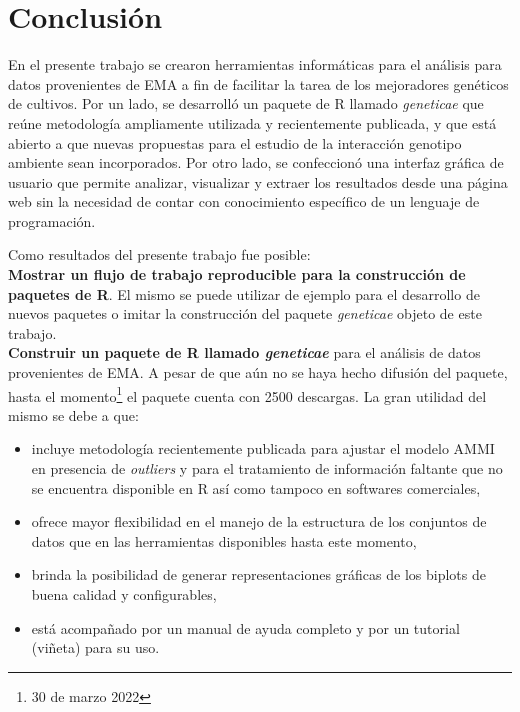 \chapter{Conclusión}

En el presente trabajo se crearon herramientas informáticas para el análisis para datos provenientes de EMA a fin de facilitar la tarea de los mejoradores genéticos de cultivos. Por un lado, se desarrolló un paquete de R llamado \emph{geneticae} que reúne metodología ampliamente utilizada y recientemente publicada, y que está abierto a que nuevas propuestas para el estudio de la interacción genotipo ambiente sean incorporados. Por otro lado, se confeccionó una interfaz gráfica de usuario que permite analizar, visualizar y extraer los resultados desde una página web sin la necesidad de contar con conocimiento específico de un lenguaje de programación.

Como resultados del presente trabajo fue posible:\\

\textbf{Mostrar un flujo de trabajo reproducible para la construcción de paquetes de R}. El mismo se puede utilizar de ejemplo para el desarrollo de nuevos paquetes o imitar la construcción del paquete \emph{geneticae} objeto de este trabajo. \\

\textbf{Construir un paquete de R llamado \emph{geneticae}} para el análisis de datos provenientes de EMA. A pesar de que aún no se haya hecho difusión del paquete, hasta el momento\footnote{30 de marzo 2022} el paquete cuenta con 2500 descargas. La gran utilidad del mismo se debe a que:

\begin{itemize}
\item incluye metodología recientemente publicada para ajustar el modelo AMMI en presencia de \emph{outliers} y para el tratamiento de información faltante que no se encuentra disponible en R así como tampoco en softwares comerciales,

\item ofrece mayor flexibilidad en el manejo de la estructura de los conjuntos de datos que en las herramientas disponibles hasta este momento,

\item brinda la posibilidad de generar representaciones gráficas de los biplots de buena calidad y configurables,

\item está acompañado por un manual de ayuda completo y por un tutorial (viñeta) para su uso.
\end{itemize}


